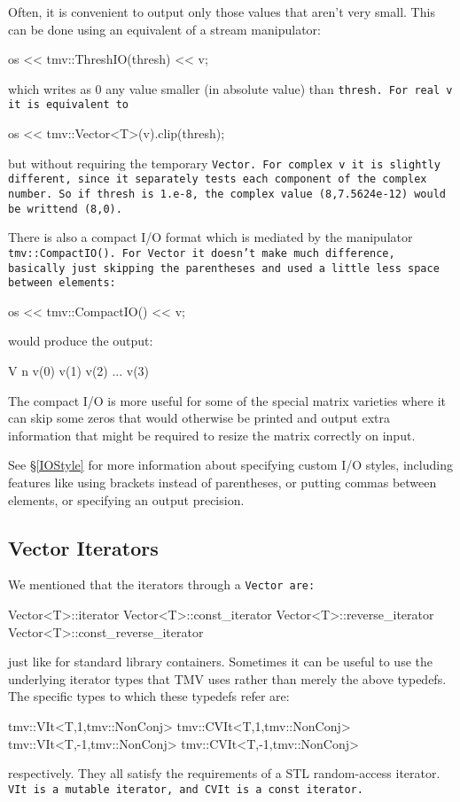 Often, it is convenient to output only those values that aren't very small. 
This can be done using an equivalent of a stream manipulator:
\begin{tmvcode}
os << tmv::ThreshIO(thresh) << v;
\end{tmvcode}
which writes as 0 any value smaller (in absolute value) than \tt{thresh}.  
For real \tt{v} it is equivalent to
\begin{tmvcode}
os << tmv::Vector<T>(v).clip(thresh);
\end{tmvcode}
but without requiring the temporary \tt{Vector}.  For complex \tt{v} it is slightly different, since it separately tests each component of the complex number.  So if \tt{thresh} is \tt{1.e-8}, the complex value \tt{(8,7.5624e-12)} would be writtend \tt{(8,0)}.

There is also a compact I/O format which is mediated by the manipulator
\tt{tmv::CompactIO()}.  For \tt{Vector} it doesn't make much difference, basically
just skipping the parentheses and used a little less space between elements:
\begin{tmvcode}
os << tmv::CompactIO() << v;
\end{tmvcode}
would produce the output:
\begin{tmvcode}
V n v(0) v(1) v(2) ... v(3)
\end{tmvcode}
The compact I/O is more useful for some of the special matrix varieties where it can skip 
some zeros that would otherwise be printed and output extra information that might be required
to resize the matrix correctly on input.

See \S\ref{IOStyle} for more information about specifying custom I/O styles, including
features like using brackets instead of parentheses, or putting commas between elements,
or specifying an output precision.  

\subsection{Vector Iterators}
\label{VectorIterators}

We mentioned that the iterators through a \tt{Vector} are:
\begin{tmvcode}
Vector<T>::iterator
Vector<T>::const_iterator
Vector<T>::reverse_iterator
Vector<T>::const_reverse_iterator
\end{tmvcode}
just like for standard library containers.  Sometimes it can be useful to use the underlying iterator types that TMV uses rather than merely the above typedefs.  The specific types to which these
typedefs refer are:
\begin{tmvcode}
tmv::VIt<T,1,tmv::NonConj>
tmv::CVIt<T,1,tmv::NonConj>
tmv::VIt<T,-1,tmv::NonConj>
tmv::CVIt<T,-1,tmv::NonConj>
\end{tmvcode}
\label{VIt}
\label{CVIt}
respectively.  They all satisfy the requirements of a STL random-access iterator.
\tt{VIt} is a mutable iterator, and \tt{CVIt} is a const iterator.

